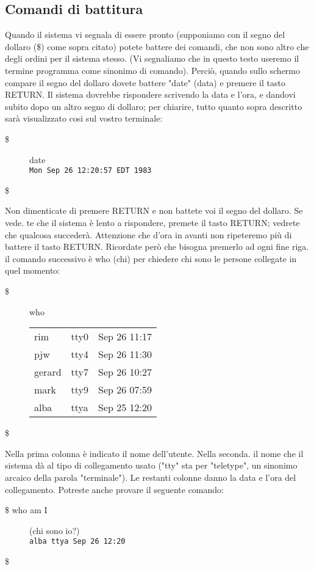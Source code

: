 \subsection{Comandi di battitura}
Quando il sistema vi segnala di essere pronto (supponiamo con il segno del dollaro (\$)
come sopra citato) potete battere dei comandi, che non sono altro che degli ordini per
il sistema stesso. (Vi segnaliamo che in questo testo useremo il termine programma
come sinonimo di comando). Perciò, quando sullo schermo compare il segno del dollaro
dovete battere "date" (data) e premere il tasto RETURN. Il sistema dovrebbe rispondere
scrivendo la data e l'ora, e dandovi subito dopo un altro segno di dollaro;
per chiarire, tutto quanto sopra descritto sarà visualizzato cosi sul vostro terminale:
\begin{description}
	\item[\$ ] date \\
	{\tt Mon Sep 26 12:20:57 EDT 1983}
	\item[\$ ]
\end{description}
Non dimenticate di premere RETURN e non battete voi il segno del dollaro. Se vede.
te che il sistema è lento a rispondere, premete il tasto RETURN; vedrete che qualcosa
succederà. Attenzione che d'ora in avanti non ripeteremo più di battere il tasto RETURN.
Ricordate però che bisogna premerlo ad ogni fine riga. 
il comando successivo è who (chi) per chiedere chi sono le persone collegate in quel
momento:
\begin{description}
	\item[\$ ] who\\ 
	\begin{tabular}{llr}
		rim & tty0 & Sep 26 11:17 \\
		pjw &tty4 & Sep 26 11:30 \\
		gerard & tty7 & Sep 26 10:27 \\
		mark & tty9 & Sep 26 07:59 \\
		alba & ttya & Sep 25 12:20 \\
	\end{tabular}
	\item[\$ ]
\end{description}
Nella prima colonna è indicato il nome dell'utente. Nella seconda. il nome che il sistema dà al tipo di collegamento usato ("tty" sta per "teletype", un sinonimo arcaico della parola "terminale"). Le restanti colonne danno la data e l'ora del collegamento. Potreste anche provare il seguente comando:
\begin{description}
	\item[\$ who am I ]  (chi sono io?)\\
	{\tt alba ttya Sep 26 12:20}
	\item[\$]
\end{description}
